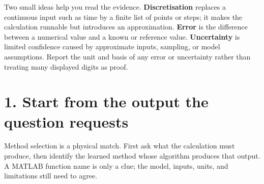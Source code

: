\documentclass[11pt,a4paper]{article}
\begin{document}
Two small ideas help you read the evidence. \textbf{Discretisation} replaces a continuous input such as time by a finite list of points or steps; it makes the calculation runnable but introduces an approximation. \textbf{Error} is the difference between a numerical value and a known or reference value. \textbf{Uncertainty} is limited confidence caused by approximate inputs, sampling, or model assumptions. Report the unit and basis of any error or uncertainty rather than treating many displayed digits as proof.

\section*{1. Start from the output the question requests}
Method selection is a physical match. First ask what the calculation must produce, then identify the learned method whose algorithm produces that output. A MATLAB function name is only a clue; the model, inputs, units, and limitations still need to agree.
\end{document}

